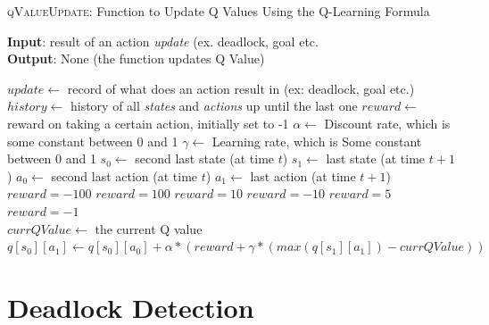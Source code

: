 \documentclass{article}
\begin{document}
\begin{algorithm}
    \caption{\textsc{qValueUpdate}: Function to Update Q Values Using the Q-Learning Formula}\label{euclid}
    \hspace*{\algorithmicindent} \textbf{Input}: result of an action \emph{update} (ex. deadlock, goal etc. \\
    \hspace*{\algorithmicindent} \textbf{Output}: None (the function updates Q Value) \\
    \begin{algorithmic}
    \State $update \gets$ record of what does an action result in (ex: deadlock, goal etc.) 
    \State $history \gets$ history of all \emph{states} and \emph{actions} up until the last one
    \State $reward \gets$ reward on taking a certain action, initially set to -1
    \State $\alpha \gets$ Discount rate, which is some constant between 0 and 1
    \State $\gamma \gets$ Learning rate, which is Some constant between 0 and 1
    \State $s_0 \gets$ second last state (at time $t$)
    \State $s_1 \gets$ last state (at time $t+1$)
    \State $a_0 \gets$ second last action (at time $t$)
    \State $a_1 \gets$ last action (at time $t+1$) \\
    
        \State $reward = -100$
        \State $reward = 100$
        \State $reward = 10$
        \State $reward = -10$
        \State $reward = 5$
        \State $reward = -1$
    \EndIf \\
    
    \State $currQValue \gets$ the current Q value
    \State $q[s_0][a_1] \gets q[s_0][a_0] + \alpha * (reward + \gamma * (max(q[s_1][a_1]) - currQValue))$
    \end{algorithmic}
\end{algorithm}

\section{Deadlock Detection}
\end{document}
